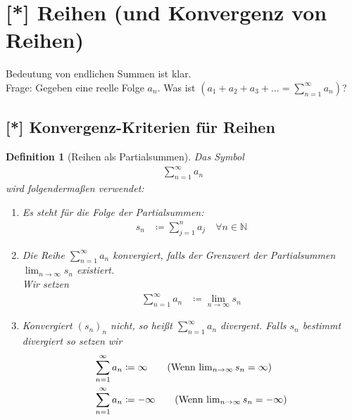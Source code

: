 \documentclass[11pt, twoside, a4paper]{article}
\theoremstyle{plain}
\newtheorem{definition}[blockelement]{Definition}
\newcommand{\pair}[1]{\left(#1\right)}
\newcommand{\definedas}[0]{\coloneqq}
\newcommand{\fromto}{\rightarrow{}}
\newcommand{\naturalnumbers}{\mathbb{N}}
\begin{document}
    \newpage


    \section{[*] Reihen (und Konvergenz von Reihen)}

    Bedeutung von endlichen Summen ist klar.\\
    Frage: Gegeben eine reelle Folge $a_n$. Was ist $\pair{a_1 + a_2 + a_3 + \dots = \sum_{n=1}^{\infty} a_n}$?

    \subsection{[*] Konvergenz-Kriterien für Reihen}

    \begin{definition}[Reihen als Partialsummen] %
        Das Symbol
        \begin{align*}
            \sum_{n=1}^{\infty} a_n\tag{Sei $a_n$ eine reelle Folge}
        \end{align*}
        wird folgendermaßen verwendet:

        \begin{enumerate}[label=\alph*)]
            \item Es steht für die Folge der Partialsummen:
            \begin{align*}
                s_n&\definedas \sum_{j=1}^{n} a_j\quad\forall n\in\naturalnumbers
            \end{align*}
            \item Die Reihe $\sum_{n=1}^{\infty} a_n$ konvergiert, falls der Grenzwert der Partialsummen $\lim_{n\fromto\infty} s_n$ existiert.\\
            Wir setzen
            \begin{align*}
                \sum_{n=1}^{\infty} a_n &\definedas \lim_{n\fromto\infty} s_n
            \end{align*}
            \item Konvergiert $(s_n)_n$ nicht, so heißt $\sum_{n=1}^{\infty} a_n$ divergent. Falls $s_n$ bestimmt divergiert so setzen wir
            \begin{align*}
                \sum_{n=1}^{\infty} a_n &\definedas \infty \tag{Wenn $\lim_{n\fromto\infty} s_n = \infty$}\\
                \sum_{n=1}^{\infty} a_n &\definedas -\infty \tag{Wenn $\lim_{n\fromto\infty} s_n = -\infty$}
            \end{align*}
        \end{enumerate}
    \end{definition}
\end{document}
